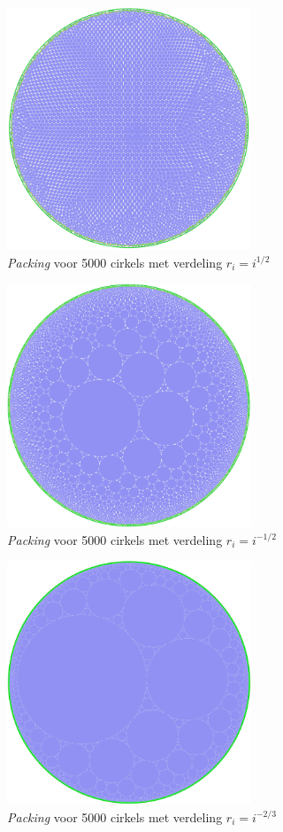 \documentclass[12pt,a4paper,oneside]{book}
\begin{document}
{%
\begin{figure}
  \centering
  \includegraphics[width=0.65\textwidth]{packing-1div2-5000.png}
  \caption{\textit{Packing} voor 5000 cirkels met verdeling $r_i=i^{1/2}$}
\end{figure}

\begin{figure}
  \centering
  \includegraphics[width=0.65\textwidth]{packing-neg1div2-5000.png}
  \caption{\textit{Packing} voor 5000 cirkels met verdeling $r_i=i^{-1/2}$}
\end{figure}

\begin{figure}
  \centering
  \includegraphics[width=0.65\textwidth]{packing-neg2div3-5000.png}
  \caption{\textit{Packing} voor 5000 cirkels met verdeling $r_i=i^{-2/3}$}
\end{figure}

}
\end{document}
